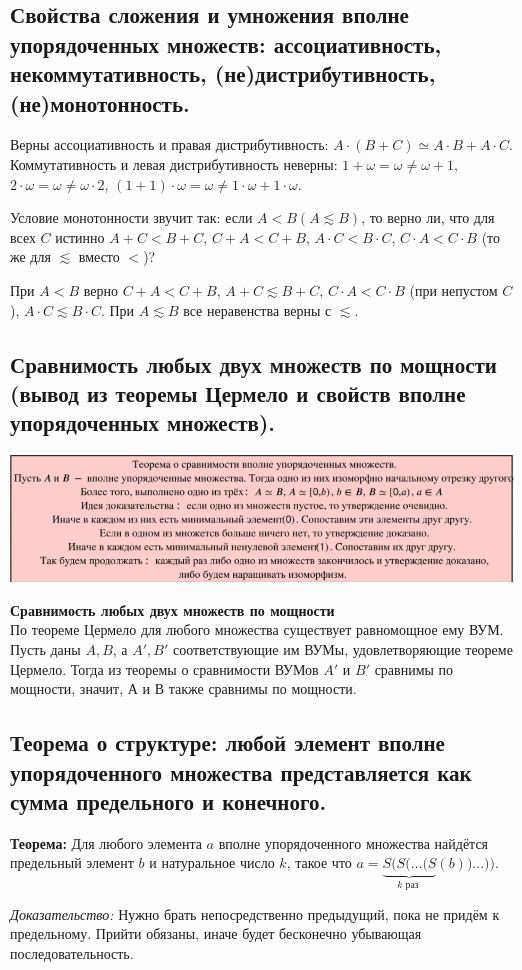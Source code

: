 \subsection{Свойства сложения и умножения вполне упорядоченных множеств: ассоциативность, некоммутативность, (не)дистрибутивность, (не)монотонность.}

Верны ассоциативность и правая дистрибутивность: $A\cdot(B + C) \simeq A\cdot B + A\cdot C$. Коммутативность и левая дистрибутивность неверны: $1+\omega = \omega \neq \omega+1$, $2 \cdot \omega = \omega \neq \omega \cdot 2$, $(1 + 1) \cdot \omega = \omega \neq 1 \cdot \omega + 1 \cdot \omega$.

Условие монотонности звучит так: если $A < B (A \lesssim B)$, то верно ли, что для всех $C$ истинно $A+C < B+C$, $C + A < C + B$, $A \cdot C < B \cdot C$, $C \cdot A < C \cdot B$ (то же для $\lesssim$ вместо $<$)?

При $A < B$ верно $C + A < C + B$, $A + C \lesssim B + C$, $C \cdot A < C \cdot B$ (при непустом $C$), $A \cdot C \lesssim B \cdot C$. При $A \lesssim B$ все неравенства верны с $\lesssim$.

\subsection{Сравнимость любых двух множеств по мощности (вывод из теоремы Цермело и свойств вполне упорядоченных множеств).}
\begin{center}
    \includegraphics[width = 17cm]{images/2 (определения)_mm1.PNG}\\    
\end{center}
\textbf{Сравнимость любых двух множеств по мощности}\\
По теореме Цермело для любого множества существует равномощное ему ВУМ. Пусть даны $A, B$, а $A', B'$ соответствующие им ВУМы, удовлетворяющие теореме Цермело. Тогда из теоремы о сравнимости ВУМов $A'$ и $B'$ сравнимы по мощности, значит, $А$ и $В$ также сравнимы по мощности.

\subsection{Теорема о структуре: любой элемент вполне упорядоченного множества представляется как сумма предельного и конечного.}

\textbf{Теорема:} Для любого элемента $a$ вполне упорядоченного множества найдётся предельный элемент $b$ и натуральное число $k$, такое что $a = \underbrace{S(S(\ldots (S}_{k \text{ раз }}(b))\ldots))$.

\textit{Доказательство:} Нужно брать непосредственно предыдущий, пока не придём к предельному. Прийти обязаны, иначе будет бесконечно убывающая последовательность.